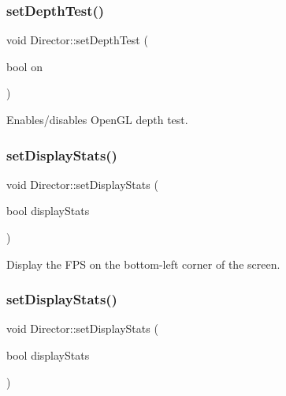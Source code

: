 \subsubsection{\texorpdfstring{set\+Depth\+Test()}{setDepthTest()}\hspace{0.1cm}{\footnotesize\ttfamily [2/2]}}
{\footnotesize\ttfamily void Director\+::set\+Depth\+Test (\begin{DoxyParamCaption}\item[{bool}]{on }\end{DoxyParamCaption})}

Enables/disables Open\+GL depth test. \mbox{\label{classDirector_a97986d4c3f91e7758316e3f0a0396baa}} 
\subsubsection{\texorpdfstring{set\+Display\+Stats()}{setDisplayStats()}\hspace{0.1cm}{\footnotesize\ttfamily [1/2]}}
{\footnotesize\ttfamily void Director\+::set\+Display\+Stats (\begin{DoxyParamCaption}\item[{bool}]{display\+Stats }\end{DoxyParamCaption})\hspace{0.3cm}{\ttfamily [inline]}}

Display the F\+PS on the bottom-\/left corner of the screen. \mbox{\label{classDirector_a97986d4c3f91e7758316e3f0a0396baa}} 
\subsubsection{\texorpdfstring{set\+Display\+Stats()}{setDisplayStats()}\hspace{0.1cm}{\footnotesize\ttfamily [2/2]}}
{\footnotesize\ttfamily void Director\+::set\+Display\+Stats (\begin{DoxyParamCaption}\item[{bool}]{display\+Stats }\end{DoxyParamCaption})\hspace{0.3cm}{\ttfamily [inline]}}


